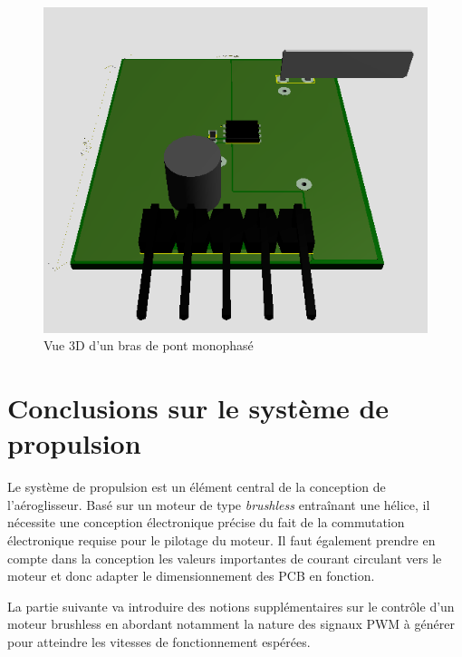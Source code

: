 \begin{landscape}
		\newpage
		
		\begin{figure}
			\begin{center}
				\includegraphics[scale=1.3]{../Illus/phase_gen_3dview.png}
			\end{center}
			\caption{Vue 3D d'un bras de pont monophasé}
			\label{phase_gen_3dview}
		\end{figure}
		
		\end{landscape}	 
		
		\newpage
			
	\section{Conclusions sur le système de propulsion}
	
	Le système de propulsion est un élément central de la conception
	de l'aéroglisseur. Basé sur un moteur de type \textit{brushless}
	entraînant une hélice, il nécessite une conception électronique 
	précise du fait de la commutation électronique requise pour le 
	pilotage du moteur. Il faut également prendre en compte dans la
	conception les valeurs importantes de courant circulant vers le
	moteur et donc adapter le dimensionnement des PCB en fonction.   
	
	La partie suivante va introduire des notions supplémentaires
	sur le contrôle d'un moteur brushless en abordant notamment
	la nature des signaux PWM à générer pour atteindre les
	vitesses de fonctionnement espérées. 
	
\newcommand{\pic}{\texttt{PIC16F1619} }
\newcommand{\dspic}{\texttt{dsPIC30F2010} }